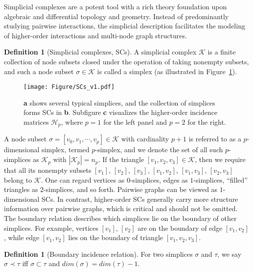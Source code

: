 \documentclass[letterpaper]{article} \usepackage{aaai24}
\theoremstyle{plain}
\theoremstyle{definition}
\newtheorem{definition}[theorem]{Definition}
\theoremstyle{remark}
\begin{document}
Simplicial complexes \cite{HigherOrderReview2020} are a potent tool with a rich theory foundation upon algebraic and differential topology and geometry. 
Instead of predominantly studying pairwise interactions, the simplicial description facilitates the modeling of higher-order interactions and multi-node graph structures.



\begin{definition}[Simplicial complexes, SCs]
A simplicial complex $\mathcal{K}$ is a finite collection of node subsets closed under the operation of taking nonempty subsets, and such a node subset $\sigma \in \mathcal{K}$ is called a simplex (as illustrated in Figure~\ref{fig:SCs}). 
\end{definition}

\begin{figure}[!ht]
\centering
\texttt{[image: Figure/SCs\_v1.pdf]}
\caption{ \textbf{a} shows several typical simplices, and the collection of simplices forms SCs in \textbf{b}. Subfigure \textbf{c} visualizes the higher-order incidence matrices $\mathcal{H}_p$, where $p=1$ for the left panel and $p=2$ for the right.}
\label{fig:SCs}
\end{figure}


A node subset $\sigma = \left[v_0,v_1,\cdots,v_p\right] \in \mathcal{K}$ with cardinality $p+1$ is referred to as a $p$-dimensional simplex, termed $p$-simplex, and we denote the set of all such $p$-simplices as $\mathcal{K}_p $ with $|\mathcal{K}_p| = n_p$.
If the triangle $\left[v_1,v_2,v_3\right] \in \mathcal{K}$, then we require that all its nonempty subsets $\left[v_1\right]$, $\left[v_2\right]$, $\left[v_3\right]$, $\left[v_1,v_2\right]$, $\left[v_1,v_3\right]$, $\left[v_2,v_3\right]$ belong to $\mathcal{K}$.  One can regard vertices as $0$-simplices, edges as $1$-simplices, “filled” triangles as $2$-simplices, and so forth. 
Pairwise graphs can be viewed as $1$-dimensional SCs. In contrast, higher-order SCs generally carry more structure information over pairwise graphs, which is critical and should not be omitted.
The boundary relation describes which simplices lie on the boundary of other simplices. For example, vertices $\left[v_1\right]$, $\left[v_2\right]$ are on the boundary of edge $\left[v_1,v_2\right]$, while edge $\left[v_1,v_2\right]$ lies on the boundary of triangle $\left[v_1,v_2,v_3\right]$.


\begin{definition}[Boundary incidence relation]
For two simplices $\sigma$ and $\tau$, we say $\sigma \prec \tau$ iff $\sigma \subset \tau$ and $dim(\sigma) = dim(\tau)-1$.
\end{definition}
\end{document}
